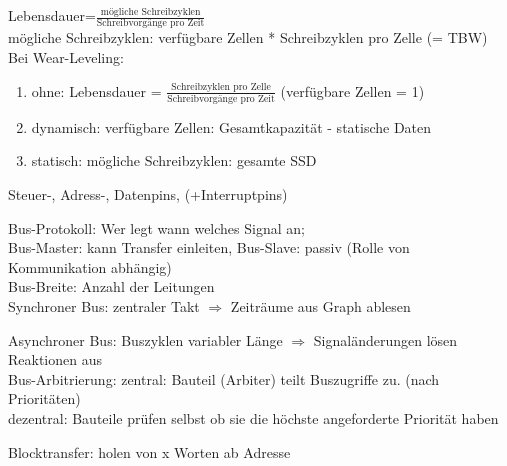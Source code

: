 Lebensdauer=$\frac{\text{mögliche Schreibzyklen}}{\text{Schreibvorgänge pro Zeit}}$\\
mögliche Schreibzyklen: verfügbare Zellen * Schreibzyklen pro Zelle (= TBW)\\

Bei Wear-Leveling: 
\begin{enumerate}
\item ohne: Lebensdauer = $\frac{\text{Schreibzyklen pro Zelle}}{\text{Schreibvorgänge pro Zeit}}$ (verfügbare Zellen = 1)
\item dynamisch: verfügbare Zellen: Gesamtkapazität - statische Daten
\item statisch: mögliche Schreibzyklen: gesamte SSD
\end{enumerate}


Steuer-, Adress-, Datenpins, (+Interruptpins)

Bus-Protokoll: Wer legt wann welches Signal an;	\\
Bus-Master: kann Transfer einleiten, Bus-Slave: passiv (Rolle von Kommunikation abhängig)\\
Bus-Breite: Anzahl der Leitungen \\

Synchroner Bus: zentraler Takt $\Rightarrow$ Zeiträume aus Graph ablesen

Asynchroner Bus: Buszyklen variabler Länge $\Rightarrow$ Signaländerungen lösen Reaktionen aus\\

Bus-Arbitrierung: zentral: Bauteil (Arbiter) teilt Buszugriffe zu. (nach Prioritäten)\\
dezentral: Bauteile prüfen selbst ob sie die höchste angeforderte Priorität haben

Blocktransfer: holen von x Worten ab Adresse
